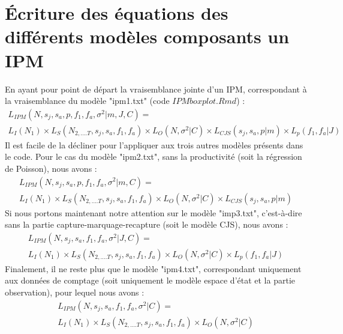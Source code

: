 \documentclass[12pt,a4paper]{article}
\begin{document}
\section{Écriture des équations des différents modèles composants un IPM}
En ayant pour point de départ la vraisemblance jointe d'un IPM, correspondant à la vraisemblance du modèle "ipm1.txt" (code $IPMboxplot.Rmd$) :\\
\begin{equation}
\begin{aligned}
L_{IPM}(N, s_{j}, s_{a}, p, f_{1}, f_{a}, \sigma^{2}|\textit{m},J,C)= \\
L_{I}(N_{1})\times L_{S}(N_{2,....T}, s_{j}, s_{a}, f_{1}, f_{a})\times L_{O}(N,\sigma^{2}|C)\times L_{CJS}(s_{j}, s_{a}, p|\textit{m})\times L_{p}(f_{1}, f_{a}|J)
\end{aligned}
\end{equation}
Il est facile de la décliner pour l'appliquer aux trois autres modèles présents dans le code. Pour le cas du modèle "ipm2.txt", sans la productivité (soit la régression de Poisson), nous avons : 
\begin{equation}
\begin{aligned}
L_{IPM}(N, s_{j}, s_{a}, p, f_{1}, f_{a}, \sigma^{2}|\textit{m},C)= \\
L_{I}(N_{1})\times L_{S}(N_{2,....T}, s_{j}, s_{a}, f_{1}, f_{a})\times L_{O}(N,\sigma^{2}|C)\times L_{CJS}(s_{j}, s_{a}, p|\textit{m})
\end{aligned}
\end{equation}
Si nous portons maintenant notre attention sur le modèle "imp3.txt", c'est-à-dire sans la partie capture-marquage-recapture (soit le modèle CJS), nous avons :
\begin{equation}
\begin{aligned}
L_{IPM}(N, s_{j}, s_{a}, f_{1}, f_{a}, \sigma^{2}|J,C)= \\
L_{I}(N_{1})\times L_{S}(N_{2,....T}, s_{j}, s_{a}, f_{1}, f_{a})\times L_{O}(N,\sigma^{2}|C)\times L_{p}(f_{1}, f_{a}|J)
\end{aligned}
\end{equation}
Finalement, il ne reste plus que le modèle "ipm4.txt", correspondant uniquement aux données de comptage (soit uniquement le modèle espace d'état et la partie observation), pour lequel nous avons : 
\begin{equation}
\begin{aligned}
L_{IPM}(N, s_{j}, s_{a}, f_{1}, f_{a}, \sigma^{2}|C)= \\
L_{I}(N_{1})\times L_{S}(N_{2,....T}, s_{j}, s_{a}, f_{1}, f_{a})\times L_{O}(N,\sigma^{2}|C)
\end{aligned}
\end{equation}
\end{document}
